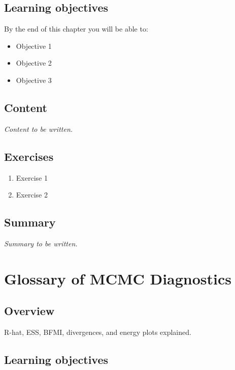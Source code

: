 \documentclass[
  11pt,
  a4paper,
  oneside,
  openany]{scrbook}
\providecommand{\tightlist}{%
  \setlength{\itemsep}{0pt}\setlength{\parskip}{0pt}}\usepackage{longtable,booktabs,array}
\begin{document}
\section{Learning objectives}\label{learning-objectives-17}

By the end of this chapter you will be able to:

\begin{itemize}
\tightlist
\item[$\square$]
  Objective 1
\item[$\square$]
  Objective 2
\item[$\square$]
  Objective 3
\end{itemize}

\section{Content}\label{content-16}

\emph{Content to be written.}

\section{Exercises}\label{exercises-17}

\begin{enumerate}
\def\labelenumi{\arabic{enumi}.}
\tightlist
\item
  Exercise 1
\item
  Exercise 2
\end{enumerate}

\section{Summary}\label{summary-17}

\emph{Summary to be written.}

\chapter{Glossary of MCMC
Diagnostics}\label{glossary-of-mcmc-diagnostics}

\section{Overview}\label{overview-18}

R-hat, ESS, BFMI, divergences, and energy plots explained.

\section{Learning objectives}\label{learning-objectives-18}
\end{document}
